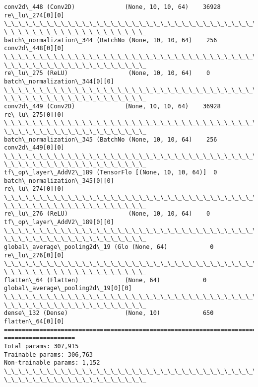 \documentclass[11pt]{article}
\begin{document}
\begin{Verbatim}[commandchars=\\\{\}]
conv2d\_448 (Conv2D)              (None, 10, 10, 64)    36928
re\_lu\_274[0][0]
\_\_\_\_\_\_\_\_\_\_\_\_\_\_\_\_\_\_\_\_\_\_\_\_\_\_\_\_\_\_\_\_\_\_\_\_\_\_\_\_\_\_\_\_\_\_\_\_\_\_\_\_\_\_\_\_\_\_\_\_\_\_\_\_\_\_\_\_\_\_\_\_\_\_\_\_\_\_\_\_
\_\_\_\_\_\_\_\_\_\_\_\_\_\_\_\_\_\_\_\_
batch\_normalization\_344 (BatchNo (None, 10, 10, 64)    256
conv2d\_448[0][0]
\_\_\_\_\_\_\_\_\_\_\_\_\_\_\_\_\_\_\_\_\_\_\_\_\_\_\_\_\_\_\_\_\_\_\_\_\_\_\_\_\_\_\_\_\_\_\_\_\_\_\_\_\_\_\_\_\_\_\_\_\_\_\_\_\_\_\_\_\_\_\_\_\_\_\_\_\_\_\_\_
\_\_\_\_\_\_\_\_\_\_\_\_\_\_\_\_\_\_\_\_
re\_lu\_275 (ReLU)                 (None, 10, 10, 64)    0
batch\_normalization\_344[0][0]
\_\_\_\_\_\_\_\_\_\_\_\_\_\_\_\_\_\_\_\_\_\_\_\_\_\_\_\_\_\_\_\_\_\_\_\_\_\_\_\_\_\_\_\_\_\_\_\_\_\_\_\_\_\_\_\_\_\_\_\_\_\_\_\_\_\_\_\_\_\_\_\_\_\_\_\_\_\_\_\_
\_\_\_\_\_\_\_\_\_\_\_\_\_\_\_\_\_\_\_\_
conv2d\_449 (Conv2D)              (None, 10, 10, 64)    36928
re\_lu\_275[0][0]
\_\_\_\_\_\_\_\_\_\_\_\_\_\_\_\_\_\_\_\_\_\_\_\_\_\_\_\_\_\_\_\_\_\_\_\_\_\_\_\_\_\_\_\_\_\_\_\_\_\_\_\_\_\_\_\_\_\_\_\_\_\_\_\_\_\_\_\_\_\_\_\_\_\_\_\_\_\_\_\_
\_\_\_\_\_\_\_\_\_\_\_\_\_\_\_\_\_\_\_\_
batch\_normalization\_345 (BatchNo (None, 10, 10, 64)    256
conv2d\_449[0][0]
\_\_\_\_\_\_\_\_\_\_\_\_\_\_\_\_\_\_\_\_\_\_\_\_\_\_\_\_\_\_\_\_\_\_\_\_\_\_\_\_\_\_\_\_\_\_\_\_\_\_\_\_\_\_\_\_\_\_\_\_\_\_\_\_\_\_\_\_\_\_\_\_\_\_\_\_\_\_\_\_
\_\_\_\_\_\_\_\_\_\_\_\_\_\_\_\_\_\_\_\_
tf\_op\_layer\_AddV2\_189 (TensorFlo [(None, 10, 10, 64)]  0
batch\_normalization\_345[0][0]
re\_lu\_274[0][0]
\_\_\_\_\_\_\_\_\_\_\_\_\_\_\_\_\_\_\_\_\_\_\_\_\_\_\_\_\_\_\_\_\_\_\_\_\_\_\_\_\_\_\_\_\_\_\_\_\_\_\_\_\_\_\_\_\_\_\_\_\_\_\_\_\_\_\_\_\_\_\_\_\_\_\_\_\_\_\_\_
\_\_\_\_\_\_\_\_\_\_\_\_\_\_\_\_\_\_\_\_
re\_lu\_276 (ReLU)                 (None, 10, 10, 64)    0
tf\_op\_layer\_AddV2\_189[0][0]
\_\_\_\_\_\_\_\_\_\_\_\_\_\_\_\_\_\_\_\_\_\_\_\_\_\_\_\_\_\_\_\_\_\_\_\_\_\_\_\_\_\_\_\_\_\_\_\_\_\_\_\_\_\_\_\_\_\_\_\_\_\_\_\_\_\_\_\_\_\_\_\_\_\_\_\_\_\_\_\_
\_\_\_\_\_\_\_\_\_\_\_\_\_\_\_\_\_\_\_\_
global\_average\_pooling2d\_19 (Glo (None, 64)            0
re\_lu\_276[0][0]
\_\_\_\_\_\_\_\_\_\_\_\_\_\_\_\_\_\_\_\_\_\_\_\_\_\_\_\_\_\_\_\_\_\_\_\_\_\_\_\_\_\_\_\_\_\_\_\_\_\_\_\_\_\_\_\_\_\_\_\_\_\_\_\_\_\_\_\_\_\_\_\_\_\_\_\_\_\_\_\_
\_\_\_\_\_\_\_\_\_\_\_\_\_\_\_\_\_\_\_\_
flatten\_64 (Flatten)             (None, 64)            0
global\_average\_pooling2d\_19[0][0]
\_\_\_\_\_\_\_\_\_\_\_\_\_\_\_\_\_\_\_\_\_\_\_\_\_\_\_\_\_\_\_\_\_\_\_\_\_\_\_\_\_\_\_\_\_\_\_\_\_\_\_\_\_\_\_\_\_\_\_\_\_\_\_\_\_\_\_\_\_\_\_\_\_\_\_\_\_\_\_\_
\_\_\_\_\_\_\_\_\_\_\_\_\_\_\_\_\_\_\_\_
dense\_132 (Dense)                (None, 10)            650
flatten\_64[0][0]
================================================================================
====================
Total params: 307,915
Trainable params: 306,763
Non-trainable params: 1,152
\_\_\_\_\_\_\_\_\_\_\_\_\_\_\_\_\_\_\_\_\_\_\_\_\_\_\_\_\_\_\_\_\_\_\_\_\_\_\_\_\_\_\_\_\_\_\_\_\_\_\_\_\_\_\_\_\_\_\_\_\_\_\_\_\_\_\_\_\_\_\_\_\_\_\_\_\_\_\_\_
\_\_\_\_\_\_\_\_\_\_\_\_\_\_\_\_\_\_\_\_
    \end{Verbatim}
 
\end{document}
